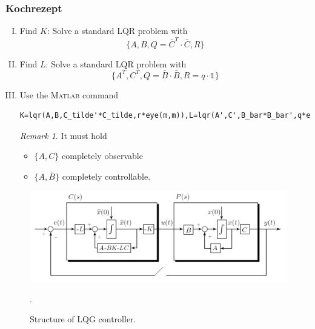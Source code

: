 \documentclass[a4paper,12 pt]{article}
\numberwithin{equation}{section}
\theoremstyle{definition}
\theoremstyle{remark}
\newtheorem*{bmk}{Remark}
\theoremstyle{definition}
\theoremstyle{definition}
\theoremstyle{definition}
\theoremstyle{remark}
\begin{document}
\subsubsection{Kochrezept}
\begin{enumerate}[(I)]
\item Find $K$: Solve a standard LQR problem with
\begin{equation}
\{A,B,Q=\bar{C}^T\cdot \bar{C},R\}
\end{equation}
\item Find $L$: Solve a standard LQR problem with
\begin{equation}
\{A^T,C^T,Q=\bar{B}\cdot \bar{B},R=q\cdot \mathbb{1}\}
\end{equation}
\item Use the \textsc{Matlab} command
\begin{verbatim}
K=lqr(A,B,C_tilde'*C_tilde,r*eye(m,m)),L=lqr(A',C',B_bar*B_bar',q*eye(p,p))'.
\end{verbatim}
\begin{bmk}
It must hold
\begin{itemize}
\item $\{ A,C\}$ completely observable
\item $\{A,\bar{B}\}$ completely controllable.
\end{itemize}
\end{bmk}

\end{enumerate}








\begin{figure}[h]
\centering
\includegraphics[width=\columnwidth]{lqg2}
\caption{Structure of LQG controller.}
\label{fig:lqg2}.
\end{figure}


\newpage
\end{document}
